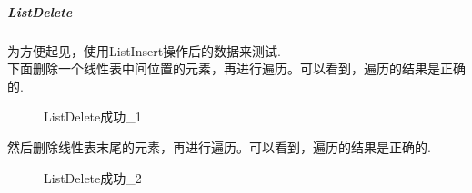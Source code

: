 \documentclass[supercite]{Experimental_Report}
\theoremstyle{definition}
\begin{document}
\subparagraph{ListDelete}
\noindent
为方便起见，使用ListInsert操作后的数据来测试.\\
下面删除一个线性表中间位置的元素，再进行遍历。可以看到，遍历的结果是正确的.
\begin{figure}[htbp]
	\centering
	\centering
	\caption{ListDelete成功\_1}
	\label{fig1-46}
\end{figure}

\clearpage
\noindent
然后删除线性表末尾的元素，再进行遍历。可以看到，遍历的结果是正确的.
\begin{figure}[htbp]
	\centering
	\centering
	\caption{ListDelete成功\_2}
	\label{fig1-47}
\end{figure}
\end{document}
